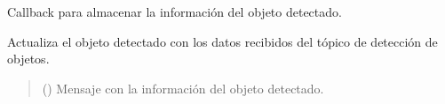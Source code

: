 \documentclass[a4paper,10pt,spanish]{sphinxmanual}
\begin{document}
\begin{fulllineitems}
\begin{fulllineitems}
\begin{quote}
\begin{description}
\end{description}\end{quote}

\end{fulllineitems}


\begin{fulllineitems}
\label{\detokenize{squad_approach_control_action:squad_approach_control_action.ApproachObjectState.object_callback}}
\pysigstartsignatures
{}
\pysigstopsignatures
\sphinxAtStartPar
Callback para almacenar la información del objeto detectado.

\sphinxAtStartPar
Actualiza el objeto detectado con los datos recibidos del tópico de detección de objetos.
\begin{quote}\begin{description}
\sphinxAtStartPar
{} () \textendash{} Mensaje con la información del objeto detectado.

\end{description}\end{quote}

\end{fulllineitems}


\end{fulllineitems}

\end{document}

